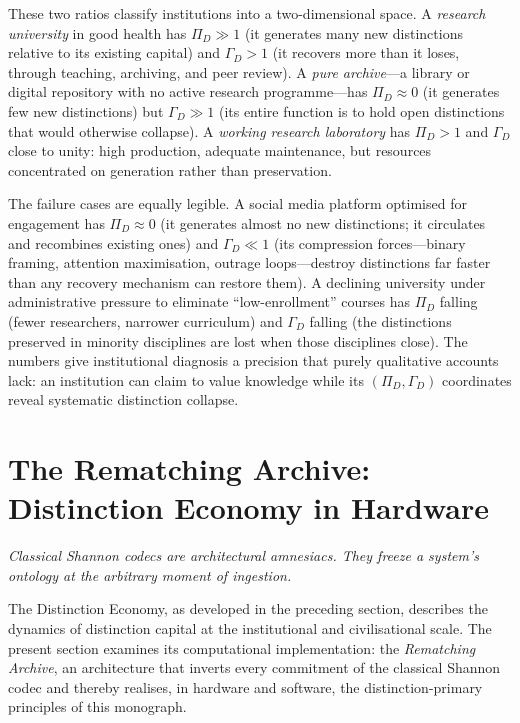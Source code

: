 \documentclass[12pt, letterpaper]{article}
\theoremstyle{remark}
\begin{document}
These two ratios classify institutions into a two-dimensional space.
A \emph{research university} in good health has $\Pi_D \gg 1$ (it
generates many new distinctions relative to its existing capital) and
$\Gamma_D > 1$ (it recovers more than it loses, through teaching,
archiving, and peer review).  A \emph{pure archive}---a library or
digital repository with no active research programme---has $\Pi_D
\approx 0$ (it generates few new distinctions) but $\Gamma_D \gg 1$
(its entire function is to hold open distinctions that would otherwise
collapse).  A \emph{working research laboratory} has $\Pi_D > 1$ and
$\Gamma_D$ close to unity: high production, adequate maintenance, but
resources concentrated on generation rather than preservation.

The failure cases are equally legible.  A social media platform optimised
for engagement has $\Pi_D \approx 0$ (it generates almost no new
distinctions; it circulates and recombines existing ones) and
$\Gamma_D \ll 1$ (its compression forces---binary framing, attention
maximisation, outrage loops---destroy distinctions far faster than any
recovery mechanism can restore them).  A declining university under
administrative pressure to eliminate ``low-enrollment'' courses has
$\Pi_D$ falling (fewer researchers, narrower curriculum) and $\Gamma_D$
falling (the distinctions preserved in minority disciplines are lost when
those disciplines close).  The numbers give institutional diagnosis a
precision that purely qualitative accounts lack: an institution can
claim to value knowledge while its $(\Pi_D, \Gamma_D)$ coordinates
reveal systematic distinction collapse.

\section{The Rematching Archive: Distinction Economy in Hardware}

\epigraph{\itshape Classical Shannon codecs are architectural amnesiacs.
They freeze a system's ontology at the arbitrary moment of ingestion.}{}

The Distinction Economy, as developed in the preceding section, describes
the dynamics of distinction capital at the institutional and civilisational
scale.  The present section examines its computational implementation: the
\emph{Rematching Archive}, an architecture that inverts every commitment of
the classical Shannon codec and thereby realises, in hardware and software,
the distinction-primary principles of this monograph.
\end{document}
